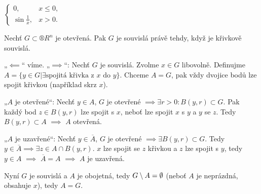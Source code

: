\documentclass[12pt]{article}					%
\begin{document}
\begin{poznamka}
	$\begin{cases} 0, & x ≤ 0,\\ \sin \frac{1}{x}, & x > 0.\end{cases}$
\end{poznamka}

\begin{veta}
	Nechť $G \subset ®R^n$ je otevřená. Pak $G$ je souvislá právě tehdy, když je křivkově souvislá.

	\begin{dukazin}
		„$\impliedby$“ víme. „$\implies$“: Nechť $G$ je souvislá. Zvolme $x \in G$ libovolně. Definujme $A = \{y \in G | \exists \text{spojitá křivka z $x$ do $y$}\}$. Chceme $A = G$, pak vždy dvojice bodů lze spojit křivkou (například skrz $x$).

		„$A$ je otevřené“: Nechť $y \in A$, $G$ je otevřené $\implies \exists r > 0: B(y, r) \subset G$. Pak každý bod $z \in B(y, r)$ lze spojit s $x$, neboť lze spojit $x$ s $y$ a $y$ se $z$. Tedy $B(y, r) \subset A$ $\implies$ $A$ otevřená.

		„$A$ je uzavřené“: Nechť $y \in \overline{A}$, $G$ je otevřené $\implies \exists B(y, r) \subset G$. Tedy $y \in \overline{A} \implies \exists z \in A \cap B(y, r)$. $x$ lze spojit se $z$ křivkou a $z$ lze spojit s $y$, tedy $y \in A$ $\implies$ $\overline{A} = A$ $\implies$ $A$ je uzavřená.

		Nyní $G$ je souvislá a $A$ je obojetná, tedy $G \setminus A = \emptyset$ (neboť $A$ je neprázdná, obsahuje $x$), tedy $A = G$.
	\end{dukazin}
\end{veta}
\end{document}
